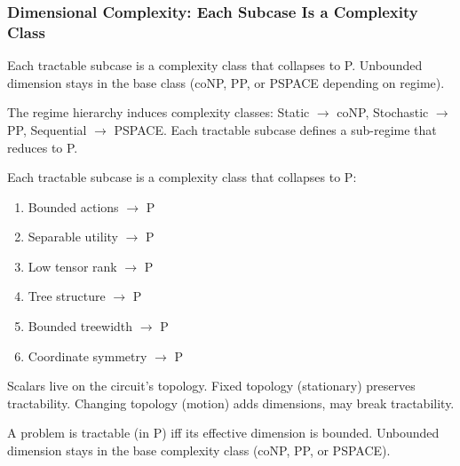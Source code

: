 \subsubsection{Dimensional Complexity: Each Subcase Is a Complexity Class}\label{sec:dimensional-complexity}

Each tractable subcase is a complexity class that collapses to P. Unbounded dimension stays in the base class (coNP, PP, or PSPACE depending on regime).

\begin{definition}\label{def:complexity-classes}
The regime hierarchy induces complexity classes: Static $\to$ coNP, Stochastic $\to$ PP, Sequential $\to$ PSPACE. Each tractable subcase defines a sub-regime that reduces to P.
\end{definition}

\begin{theorem}\label{thm:six-subcases}
Each tractable subcase is a complexity class that collapses to P:
\begin{enumerate}
\item Bounded actions $\to$ P \quad {}
\item Separable utility $\to$ P \quad {}
\item Low tensor rank $\to$ P \quad {}
\item Tree structure $\to$ P \quad {}
\item Bounded treewidth $\to$ P \quad {}
\item Coordinate symmetry $\to$ P \quad {}
\end{enumerate}
\end{theorem}

\begin{theorem}\label{thm:topology-motion}
Scalars live on the circuit's topology. Fixed topology (stationary) preserves tractability. Changing topology (motion) adds dimensions, may break tractability.
\end{theorem}

\begin{theorem}\label{thm:complexity-dichotomy}
A problem is tractable (in P) iff its effective dimension is bounded. Unbounded dimension stays in the base complexity class (coNP, PP, or PSPACE).
\end{theorem}
